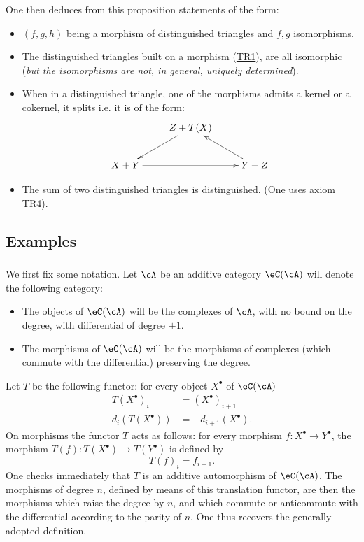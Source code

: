One then deduces from this proposition statements of the form:
\begin{itemize}
  \item $(f,g,h)$ being a morphism of distinguished triangles and $f,g$
    isomorphisms.
  \item The distinguished triangles built on a morphism
    (\hyperlink{VIII:TR1}{TR1}), are all isomorphic (\emph{but the
    isomorphisms are not, in general, uniquely determined}).
  \item When in a distinguished triangle, one of the morphisms admits a kernel
    or a cokernel, it splits i.e. it is of the form: 
    \[\xymatrix{
      & Z+T(X) \ar[dl] \\
      X+Y \ar[rr] 
        & & Y+Z \ar[ul]
    }\]
  \item The sum of two distinguished triangles is distinguished. (One uses
    axiom \hyperlink{VIII:TR4}{TR4}). 
\end{itemize}










\subsection{Examples}\label{VIII:1-2}





\subsubsection{}\label{VIII:1-2-1}

We first fix some notation. Let $\cA$ be an additive
category $\eC(\cA)$ will denote the following category:
\begin{itemize}
  \item The objects of $\eC(\cA)$ will be the complexes of $\cA$, with no
    bound on the degree, with differential of degree $+1$.
  \item The morphisms of $\eC(\cA)$ will be the morphisms of complexes (which
    commute with the differential) preserving the degree.
\end{itemize}

Let $T$ be the following functor: for every object $X^\bullet$ of $\eC(\cA)$ 
\begin{align*}
  T(X^\bullet)_i &= (X^\bullet)_{i+1} \\
  d_i(T(X^\bullet)) &= -d_{i+1}(X^\bullet)  \text{.}
\end{align*}
On morphisms the functor $T$ acts as follows: for every
morphism $f:X^\bullet \to Y^\bullet$, the morphism
$T(f):T(X^\bullet) \to T(Y^\bullet)$ is defined by 
\[
  T(f)_i = f_{i+1} \text{.}
\]
One checks immediately that $T$ is an additive automorphism of
$\eC(\cA)$. The morphisms of degree $n$, defined by means of this
translation functor, are then the morphisms which raise the degree by $n$, and
which commute or anticommute with the differential according to the parity of
$n$. One thus recovers the generally adopted definition.

